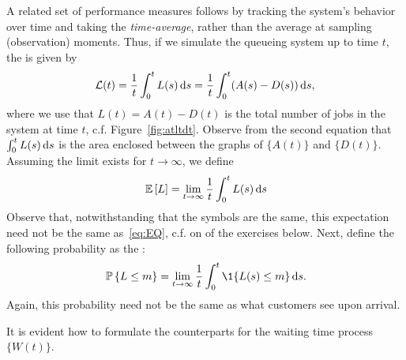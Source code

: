 A related set of performance measures follows by tracking the system's
behavior over time and taking the \emph{time-average}, rather than the
average at sampling (observation) moments. Thus, if we simulate the
queueing system up to time $t$, the  is given by
\begin{equation}\label{eq:11}
\mathcal{L}(t) = \frac 1 t\int_0^t L(s)\,\text{d}s =  \frac 1 t\int_0^t (A(s)-D(s)) \,\text{d}s,
\end{equation}
where we use that $L(t)=A(t) - D(t)$ is the total number of jobs in
the system at time $t$, c.f. Figure~\ref{fig:atltdt}.  Observe from the second equation that
$\int_0^t L(s)\,\text{d}s$ is the area enclosed between the graphs of $\{A(t)\}$
and $\{D(t)\}$. Assuming the limit exists for $t\to\infty$, we define
\begin{equation}
  \label{eq:46}
  \,\mathbb{E}\left[L\right] = \lim_{t\to\infty} \frac 1 t\int_0^t L(s) \,\text{d}s 
\end{equation}
Observe that, notwithstanding that the symbols are the same, this
expectation need not be the same as~\eqref{eq:EQ}, c.f. on of the
exercises below. Next, define the following probability as the
:
\begin{equation}
  \label{eq:47}
  \P{L\leq m} =\lim_{t\to\infty} \frac 1 t\int_0^t \1{L(s)\leq m} \d s.
\end{equation}
Again, this probability need not be the same as what customers see
upon arrival.  

It is evident how to formulate the counterparts for the waiting time
process $\{W(t)\}$.



